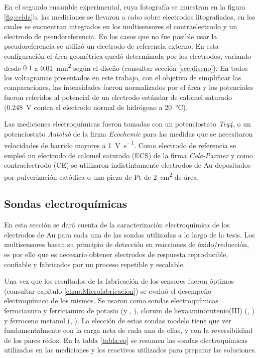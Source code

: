              En el segundo ensamble experimental, cuya fotografía se muestran en la figura \ref{fig:celda}b, las mediciones se llevaron a cabo sobre electrodos litografiados, en los cuales se encuentran integrados en los multisensores el contraelectrodo y un electrodo de pseudoreferencia. En los casos que no fue posible usar la pseudoreferencia se utilizó un electrodo de referencia externo. En esta configuración el área geométrica quedó determinada por los electrodos, variando desde $0.1$ a \SI{0.01}{\square\mm} según el diseño (consultar sección \ref{sec:diseno}). En todos los voltagramas presentados en este trabajo, con el objetivo de simplificar las comparaciones, las intensidades fueron normalizados por el área y los potenciales fueron referidos al potencial de un electrodo estándar de calomel saturado (\SI{0.248}{\volt} contra el electrodo normal de hidrógeno a \SI{20}{\celsius})\cite{BANUS1941}. 
					 		  
			 Las mediciones electroquímicas fueron tomadas con un potenciostato \textit{Teq4}, o un potenciostato \textit{Autolab} de la firma \textit{Ecochemie} para las medidas que se necesitaron velocidades de barrido mayores a \SI{1}{\volt\per\second}. Como electrodo de referencia se empleó un electrodo de calomel saturado (ECS) de la firma \textit{Cole-Parmer} y como contraelectrodo (CE) se utilizaron indistintamente electrodos de Au depositados por pulverización catódica o una pieza de Pt de \SI{2}{\square\cm} de área.  
	
	 \subsection{Sondas electroquímicas}\label{sec:respuesta_sondas_au} 

	 		En esta sección se dará cuenta de la caracterización electroquímica de los electrodos de Au para cada una de las sondas utilizadas a lo largo de la tesis. Los multisensores basan su principio de detección en reacciones de óxido/reducción, es por ello que es necesario obtener electrodos de respuesta reproducible, confiable y fabricados por un proceso repetible y escalable. 

			Una vez que los resultados de la fabricación de los sensores fueron óptimos (consultar capítulo \ref{chap:Microfabricacion}) se evaluó el desempeño electroquímico de los mismos. Se usaron como sondas electroquímicas ferrocianuro y ferricianuro de potasio (\Ferro\space y \Ferri, \fe), cloruro de hexaaminorutenio(III) (\aminorutenioCompleto, \ru) y ferroceno metanol (\ferroceno, \fc). La elección de estas sondas modelo tiene que ver fundamentalmente con la carga neta de cada una de ellas, y con la reversibildiad de los pares rédox. En la tabla \ref{tabla:eq} se resumen las sondas electroquímicas utilizadas en las mediciones y los reactivos utilizados para preparar las soluciones. 
			
